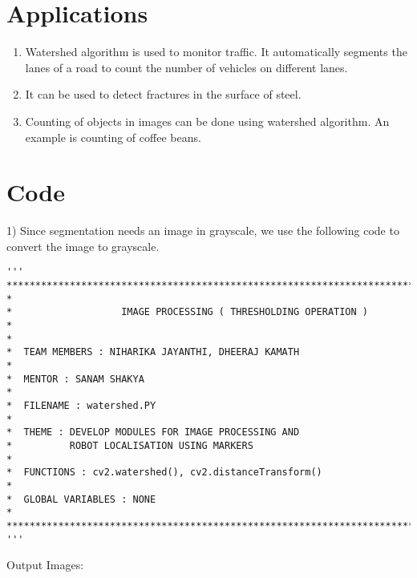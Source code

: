 \documentclass[]{article}
\begin{document}
\section{Applications}\label{additional-resources}

\begin{enumerate}
	\item Watershed algorithm is used to monitor traffic. It automatically segments the lanes of a road to count the number of vehicles on different lanes.
	\item It can be used to detect fractures in the surface of steel.
	\item Counting of objects in images can be done using watershed algorithm. An example is counting of coffee beans.
\end{enumerate}
\newpage
\section{Code}\label{code}

1) Since segmentation needs an image in grayscale, we use the following code to convert the image to grayscale.

\begin{verbatim}
'''
******************************************************************************
*
*                   IMAGE PROCESSING ( THRESHOLDING OPERATION )
*
*
*  TEAM MEMBERS : NIHARIKA JAYANTHI, DHEERAJ KAMATH
*  
*  MENTOR : SANAM SHAKYA
*
*  FILENAME : watershed.PY
*
*  THEME : DEVELOP MODULES FOR IMAGE PROCESSING AND
*          ROBOT LOCALISATION USING MARKERS
*
*  FUNCTIONS : cv2.watershed(), cv2.distanceTransform()
*
*  GLOBAL VARIABLES : NONE
*
*****************************************************************************
'''
\end{verbatim}





\newpage
Output Images:
\end{document}
